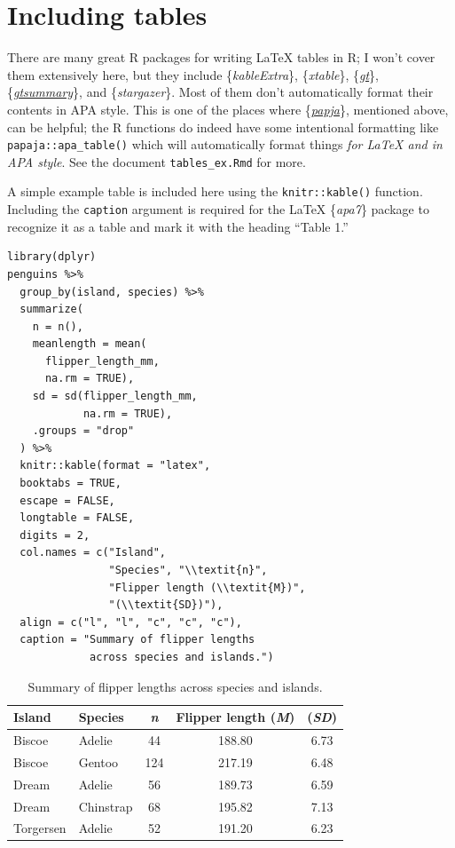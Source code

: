 \documentclass[jou]{apa7}
\begin{document}
\hypertarget{including-tables}{%
\section{Including tables}\label{including-tables}}

There are many great R packages for writing LaTeX tables in R; I won't
cover them extensively here, but they include \{\emph{kableExtra}\},
\{\emph{xtable}\},
\{\emph{\href{https://gt.rstudio.com/index.html}{gt}}\},
\{\emph{\href{https://www.danieldsjoberg.com/gtsummary/}{gtsummary}}\},
and \{\emph{stargazer}\}. Most of them don't automatically format their
contents in APA style. This is one of the places where
\{\emph{\href{https://github.com/crsh/papaja}{papja}}\}, mentioned
above, can be helpful; the R functions do indeed have some intentional
formatting like \texttt{papaja::apa\_table()} which will automatically
format things \emph{for LaTeX and in APA style}. See the document
\texttt{tables\_ex.Rmd} for more.

A simple example table is included here using the
\texttt{knitr::kable()} function. Including the \texttt{caption}
argument is required for the LaTeX \{\emph{apa7}\} package to recognize
it as a table and mark it with the heading ``Table 1.''

\begin{verbatim}
library(dplyr)
penguins %>%
  group_by(island, species) %>%
  summarize(
    n = n(), 
    meanlength = mean(
      flipper_length_mm, 
      na.rm = TRUE), 
    sd = sd(flipper_length_mm, 
            na.rm = TRUE), 
    .groups = "drop"
  ) %>%
  knitr::kable(format = "latex",
  booktabs = TRUE,
  escape = FALSE,
  longtable = FALSE,
  digits = 2,
  col.names = c("Island", 
                "Species", "\\textit{n}", 
                "Flipper length (\\textit{M})", 
                "(\\textit{SD})"),
  align = c("l", "l", "c", "c", "c"),
  caption = "Summary of flipper lengths 
             across species and islands.")
\end{verbatim}

\begin{table}

\caption{\label{tab:unnamed-chunk-3}Summary of flipper lengths across species and islands.}
\centering
\begin{tabular}[t]{llccc}
\toprule
Island & Species & \textit{n} & Flipper length (\textit{M}) & (\textit{SD})\\
\midrule
Biscoe & Adelie & 44 & 188.80 & 6.73\\
Biscoe & Gentoo & 124 & 217.19 & 6.48\\
Dream & Adelie & 56 & 189.73 & 6.59\\
Dream & Chinstrap & 68 & 195.82 & 7.13\\
Torgersen & Adelie & 52 & 191.20 & 6.23\\
\bottomrule
\end{tabular}
\end{table}
\end{document}
